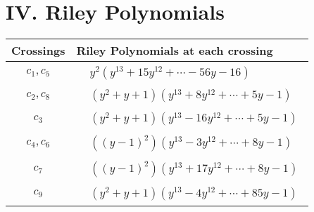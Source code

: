 \documentclass[1p]{elsarticle_modified}
\theoremstyle{definition}
\begin{document}
\centering \section*{ IV. Riley Polynomials}
\begin{tabular}{m{50pt}|m{274pt}}
Crossings & \hspace{64pt}Riley Polynomials at each crossing \\
\hline $$\begin{aligned}c_{1},c_{5}\end{aligned}$$&$\begin{aligned}
&y^2(y^{13}+15 y^{12}+\cdots-56 y-16)
\end{aligned}$\\
\hline $$\begin{aligned}c_{2},c_{8}\end{aligned}$$&$\begin{aligned}
&(y^2+y+1)(y^{13}+8 y^{12}+\cdots+5 y-1)
\end{aligned}$\\
\hline $$\begin{aligned}c_{3}\end{aligned}$$&$\begin{aligned}
&(y^2+y+1)(y^{13}-16 y^{12}+\cdots+5 y-1)
\end{aligned}$\\
\hline $$\begin{aligned}c_{4},c_{6}\end{aligned}$$&$\begin{aligned}
&((y-1)^2)(y^{13}-3 y^{12}+\cdots+8 y-1)
\end{aligned}$\\
\hline $$\begin{aligned}c_{7}\end{aligned}$$&$\begin{aligned}
&((y-1)^2)(y^{13}+17 y^{12}+\cdots+8 y-1)
\end{aligned}$\\
\hline $$\begin{aligned}c_{9}\end{aligned}$$&$\begin{aligned}
&(y^2+y+1)(y^{13}-4 y^{12}+\cdots+85 y-1)
\end{aligned}$\\
\hline
\end{tabular}
\vskip 2pc
\end{document}
